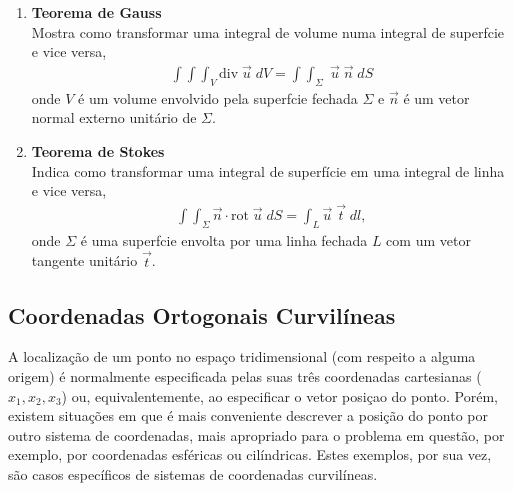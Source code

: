 \begin{enumerate}
\item {\bf Teorema de Gauss}\\
Mostra como transformar uma integral de volume numa integral de
superf\ih cie e vice versa,
\begin{eqnarray}
\int\!\!\!\int\!\!\!\int_{V} \mbox{div}\; \vec{u}\; dV = \int\!\!\!\int_{\Sigma}\; \vec{u}\;  \vec{n}\; dS
\end{eqnarray}
onde $V$ \'e um volume envolvido pela superf\ih cie fechada
$\Sigma$ e $\vec{n}$ \'e um vetor normal externo unit\'ario de
$\Sigma$.

\item {\bf Teorema de Stokes}\\
Indica como transformar uma integral de superf\'icie em uma
integral de linha e vice versa,
\begin{eqnarray}
\int\!\!\!\int_{\Sigma}\vec{n}\cdot\mbox{rot}\; \vec{u}\; dS = \int_{L}\vec{u}\; \vec{t}\; dl,
\end{eqnarray}
onde $\Sigma$ \'e uma superf\ih cie envolta por uma linha fechada
$L$ com um vetor tangente unit\'ario $\vec{t}$.

\end{enumerate}

\subsection {Coordenadas Ortogonais Curvil\'ineas}

A localiza\c{c}\~ao de um ponto no espa\c{c}o tridimensional
(com respeito a alguma origem) \'e normalmente especificada pelas
suas tr\^es coordenadas cartesianas ($x_1, x_2, x_3$) ou,
equivalentemente, ao especificar o vetor posi\c{c}ao do ponto.
Por\'em, existem situa\c{c}\~oes em que \'e mais conveniente
descrever a posi\c{c}\~ao do ponto por outro sistema
de coordenadas, mais apropriado para o problema em quest\~ao,
por exemplo, por coordenadas esf\'ericas ou cil\'indricas. Estes
exemplos, por sua vez, s\~ao casos espec\'ificos de sistemas
de coordenadas curvil\'ineas.

